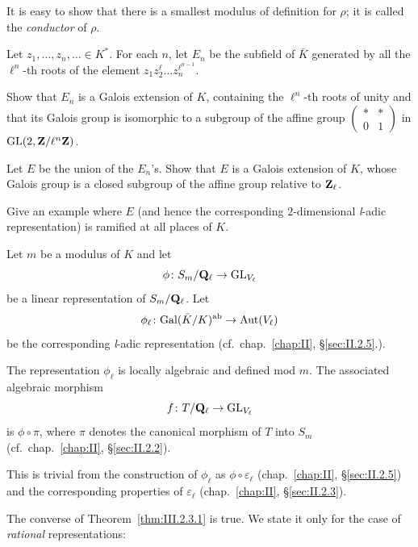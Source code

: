
It is easy to show that there is a smallest modulus of definition for
$\rho$; it is called the \emph{conductor} of $\rho$.


Let $z_1,\ldots,z_n,\ldots\in K^*$.  For each $n$, let $E_n$ be the
subfield of $\bar K$ generated by all the $\ell^n$-th roots of the
element $z_1z_2^\ell\ldots z_n^{\ell^{n-1}}$.
\begin{alist}
\item Show that $E_n$ is a Galois extension of $K$, containing the
$\ell^n$-th roots of unity and that its Galois group is isomorphic to a
subgroup of the affine group
$\begin{pmatrix} * & * \\ 0 & 1 \end{pmatrix}$ in
$\mathrm{GL}(2,\mathbf{Z}/\ell^n\mathbf{Z})$.
\item Let $E$ be the union of the $E_n$'s.  Show that $E$ is a Galois
extension of $K$, whose Galois group is a closed subgroup of the affine
group relative to $\mathbf{Z}_\ell$.
\item Give an example where $E$ (and hence the corresponding
$2$-dimensional \textit{l}-adic representation) is ramified at all places
of $K$.
\end{alist}


Let $m$ be a modulus of $K$ and let
\[
\phi\colon S_m/\mathbf{Q}_\ell \to \mathrm{GL}_{V_\ell}
\]
be a linear representation of $S_m/\mathbf{Q}_\ell$.  Let
\[
\phi_\ell\colon \mathrm{Gal}(\bar K/K)^{\mathrm{ab}} \to \mathrm{Aut}(V_\ell)
\]
be the corresponding \textit{l}-adic representation
(cf.~chap.~\ref{chap:II}, \S\ref{sec:II.2.5}.).

\begin{theorem}[1]\label{thm:III.2.3.1}
The representation $\phi_\ell$ is locally algebraic and defined mod $m$.
The associated algebraic morphism
\[
f\colon T/\mathbf{Q}_\ell \to \mathrm{GL}_{V_\ell}
\]
is $\phi\circ\pi$, where $\pi$ denotes the canonical morphism of $T$ into
$S_m$ (cf.~chap.~\ref{chap:II}, \S\ref{sec:II.2.2}).
\end{theorem}

This is trivial from the construction of $\phi_\ell$ as
$\phi\circ\varepsilon_\ell$ (chap.~\ref{chap:II}, \S\ref{sec:II.2.5}) and
the corresponding properties of $\varepsilon_\ell$
(chap.~\ref{chap:II}, \S\ref{sec:II.2.3}).

The converse of Theorem~\ref{thm:III.2.3.1} is true.  We state it only
for the case of \emph{rational} representations:


